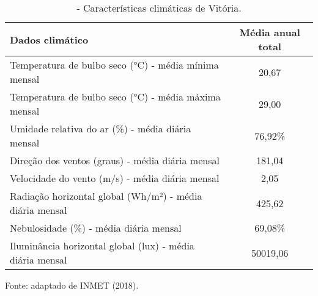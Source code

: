 \begin{table}[ht]\centering
    \caption{\small - Características climáticas de Vitória.}
    \vspace*{0.2cm}
    \label{tab:tabela2}
    \begin{tabular}{lc}
    \hline
    \textbf{Dados climático}                                  & \textbf{Média anual total}   \\ \hline
    Temperatura de bulbo seco (°C) - média mínima mensal      & 20,67                        \\ \hline
    Temperatura de bulbo seco (°C) - média máxima mensal      & 29,00                        \\ \hline
    Umidade relativa do ar (\%) - média diária mensal         & 76,92\%                      \\ \hline
    Direção dos ventos (graus) - média diária mensal          & 181,04                       \\ \hline
    Velocidade do vento (m/s) - média diária mensal           & 2,05                         \\ \hline
    Radiação horizontal global (Wh/m²) - média diária mensal  & 425,62                       \\ \hline
    Nebulosidade (\%) - média diária mensal                   & 69,08\%                      \\ \hline
    Iluminância horizontal global (lux) - média diária mensal & 50019,06                     \\ \hline
    \end{tabular}
    \begin{flushleft}
        \par \small Fonte: adaptado de INMET (2018).
    \end{flushleft}
\end{table}\vspace*{-0.3cm}
